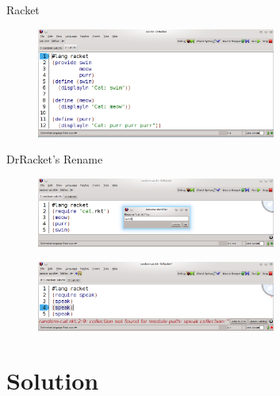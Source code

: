 \documentclass[xcolor=dvipsnames, 14pt]{beamer}
\begin{document}
\begin{frame}{Racket}
\begin{figure}[htbp]
  \centering
  \includegraphics[width=0.7\textwidth]{img/cat-definition.png}
  \label{fig:renameBefore}
\end{figure}
\end{frame}
\begin{frame}{DrRacket's Rename}
\begin{figure}[htbp]
  \centering
  \includegraphics[width=0.7\textwidth]{img/renameV2-1.png}
  \label{fig:renameBefore}
\end{figure}

\begin{figure}[htbp]
  \centering
  \includegraphics[width=0.7\textwidth]{img/rename-error.png}
  \label{fig:RacketBug}
\end{figure}
\end{frame}

\section{Solution}
\end{document}

